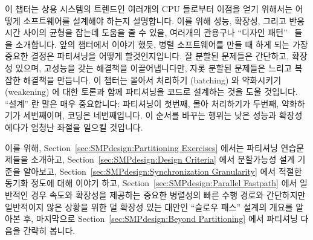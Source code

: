 

이 챕터는 상용 시스템의 트렌드인 여러개의 CPU 들로부터 이점을 얻기 위해서는
어떻게 소프트웨어를 설계해야 하는지 설명합니다.
이를 위해 성능, 확장성, 그리고 반응시간 사이의 균형을 잡는데 도움을 줄 수 있을,
여러개의 관용구나 ``디자인
패턴''~\cite{Alexander79,GOF95,SchmidtStalRohnertBuschmann2000v2Textbook} 들을
소개합니다.
앞의 챕터에서 이야기 했듯, 병렬 소프트웨어를 만들 때 하게 되는 가장 중요한
결정은 파티셔닝을 어떻게 할것인지입니다.
잘 분할된 문제들은 간단하고, 확장성 있으며, 고성능을 갖는 해결책을
이끌어냅니다만, 자롯 분할된 문제들은 느리고 복잡한 해결책을 만듭니다.
이 챕터는 몰아서 처리하기 (batching) 와 약화시키기 (weakening) 에 대한 토론과
함께 파티셔닝을 코드로 설계하는 것을 도울 것입니다.
``설계'' 란 말은 매우 중요합니다: 파티셔닝이 첫번째, 몰아 처리하기가 두번째,
약화하기가 세번째이며, 코딩은 네번째입니다.
이 순서를 바꾸는 행위는 낮은 성능과 확장성에다가 엄청난 좌절을 일으킬 것입니다.

이를 위해, Section~\ref{sec:SMPdesign:Partitioning Exercises} 에서는 파티셔닝
연습문제들을 소개하고,
Section~\ref{sec:SMPdesign:Design Criteria} 에서 분할가능성 설계 기준을
알아보고,
Section~\ref{sec:SMPdesign:Synchronization Granularity} 에서 적절한 동기화
정도에 대해 이야기 하고,
Section~\ref{sec:SMPdesign:Parallel Fastpath} 에서 일반적인 경우 속도와
확장성을 제공하는 중요한 병렬성의 빠른 수행 경로와 간단하지만 일반적이지 않은
상황을 위한 덜 확장성 있는 대안인 ``슬로우 패스'' 설계의 개요를 알아본 후,
마지막으로
Section~\ref{sec:SMPdesign:Beyond Partitioning} 에서 파티셔닝 다음을 간략히
봅니다.
\iffalse

